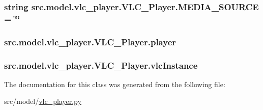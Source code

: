 \subsubsection[{M\+E\+D\+I\+A\+\_\+\+S\+O\+U\+R\+C\+E}]{\setlength{\rightskip}{0pt plus 5cm}string src.\+model.\+vlc\+\_\+player.\+V\+L\+C\+\_\+\+Player.\+M\+E\+D\+I\+A\+\_\+\+S\+O\+U\+R\+C\+E = \char`\"{}\char`\"{}\hspace{0.3cm}{\ttfamily [static]}}\label{classsrc_1_1model_1_1vlc__player_1_1VLC__Player_ae218983da86ed762827885423785dab6}
\hypertarget{classsrc_1_1model_1_1vlc__player_1_1VLC__Player_a589585abc542dbde1e3c3a9d94384875}{}
\subsubsection[{player}]{\setlength{\rightskip}{0pt plus 5cm}src.\+model.\+vlc\+\_\+player.\+V\+L\+C\+\_\+\+Player.\+player}\label{classsrc_1_1model_1_1vlc__player_1_1VLC__Player_a589585abc542dbde1e3c3a9d94384875}
\hypertarget{classsrc_1_1model_1_1vlc__player_1_1VLC__Player_a1a219abbd53bd508fcc8784ff300a3bd}{}
\subsubsection[{vlc\+Instance}]{\setlength{\rightskip}{0pt plus 5cm}src.\+model.\+vlc\+\_\+player.\+V\+L\+C\+\_\+\+Player.\+vlc\+Instance}\label{classsrc_1_1model_1_1vlc__player_1_1VLC__Player_a1a219abbd53bd508fcc8784ff300a3bd}


The documentation for this class was generated from the following file\+:\begin{DoxyCompactItemize}
\item 
src/model/\hyperlink{vlc__player_8py}{vlc\+\_\+player.\+py}\end{DoxyCompactItemize}
